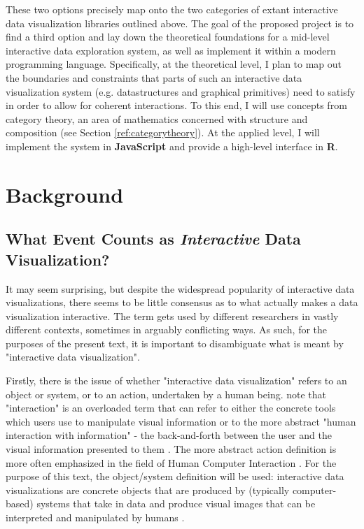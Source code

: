\documentclass[12pt,a4paper]{article}
\begin{document}
These two options precisely map onto the two categories of extant interactive data visualization libraries outlined above. The goal of the proposed project is to find a third option and lay down the theoretical foundations for a mid-level interactive data exploration system, as well as implement it within a modern programming language. Specifically, at the theoretical level, I plan to map out the boundaries and constraints that parts of such an interactive data visualization system (e.g. datastructures and graphical primitives) need to satisfy in order to allow for coherent interactions. To this end, I will use concepts from category theory, an area of mathematics concerned with structure and composition (see Section \ref{ref:categorytheory}). At the applied level, I will implement the system in \textbf{JavaScript} and provide a high-level interface in \textbf{R}.  

\section{Background}
\label{sec:background}

\subsection{What Event Counts as \textit{Interactive} Data Visualization?}
\label{sec:whatcounts}

It may seem surprising, but despite the widespread popularity of interactive data visualizations, there seems to be little consensus as to what actually makes a data visualization interactive. The term gets used by different researchers in vastly different contexts, sometimes in arguably conflicting ways. As such, for the purposes of the present text, it is important to disambiguate what is meant by "interactive data visualization".

Firstly, there is the issue of whether "interactive data visualization" refers to an object or system, or to an action, undertaken by a human being. \cite{pike2009} note that "interaction" is an overloaded term that can refer to either the concrete tools which users use to manipulate visual information or to the more abstract "human interaction with information" - the back-and-forth between the user and the visual information presented to them \citep[see also][]{yi2007}. The more abstract action definition is more often emphasized in the field of Human Computer Interaction \citep[see e.g.][]{sinha2010}. For the purpose of this text, the object/system definition will be used: interactive data visualizations are concrete objects that are produced by (typically computer-based) systems that take in data and produce visual images that can be interpreted and manipulated by humans \citep{brodbeck2009}.
\end{document}
